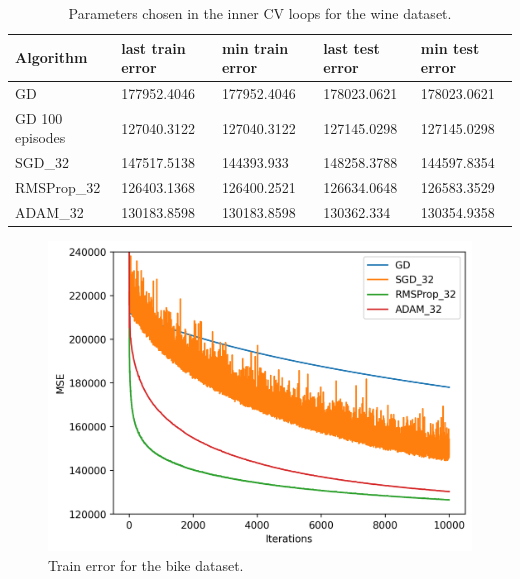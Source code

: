 \documentclass[10pt,conference,compsocconf]{IEEEtran}
\begin{document}
\begin{table}[htbp]
	\centering
	\begin{tabular}[c]{lllll}
		\hline
		Algorithm&last train error& min train error& last test error& min test error\\
		\hline		
		GD &177952.4046 &177952.4046& 178023.0621& 178023.0621\\
		GD 100 episodes &127040.3122& 127040.3122 &127145.0298& 127145.0298\\
		SGD\_32& 147517.5138& 144393.933& 148258.3788& 144597.8354\\
		RMSProp\_32& 126403.1368 &126400.2521& 126634.0648& 126583.3529\\
		ADAM\_32& 130183.8598& 130183.8598& 130362.334 &130354.9358\\
		\hline
	\end{tabular}
	\caption{Parameters chosen in the inner CV loops for the wine dataset.}
	\label{tab:bike_mses}
\end{table}




\begin{figure}[htbp]
	\centering
	\includegraphics[width=\columnwidth]{pictures/bike_train_32}
	\caption{Train error for the bike dataset.}
	\vspace{-3mm}
	\label{fig:bike_train_32}
\end{figure}
\end{document}
